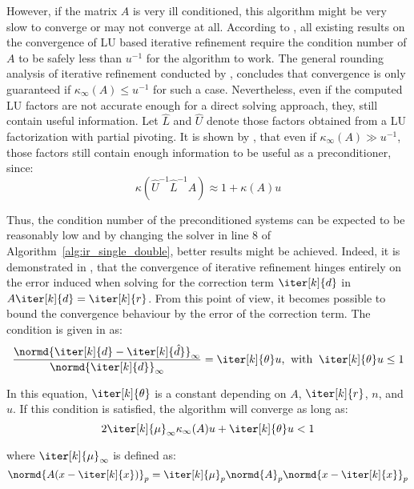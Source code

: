 However, if the matrix $A$ is very ill conditioned, this algorithm might be very slow to converge or may not converge at all. According to \cite{carson_accelerating_2018}, all existing results on the convergence of LU based iterative refinement require the condition number of $A$ to be safely less than $u^{-1}$ for the algorithm to work. The general rounding analysis of iterative refinement conducted by \cite{higham_accuracy_2002}, concludes that convergence is only guaranteed if $\kappa_\infty(A)\leq u^{-1}$ for such a case. Nevertheless, even if the computed LU factors are not accurate enough for a direct solving approach, they, still contain useful information. Let $\hat{L}$ and $\hat{U}$ denote those factors obtained from a LU factorization with partial pivoting. It is shown by \cite{carson_new_2017}, that even if $\kappa_\infty(A) \gg u^{-1}$, those factors still contain enough information to be useful as a preconditioner, since:
\begin{equation}
    \kappa(\hat{U}^{-1}\hat{L}^{-1}A)\approx 1 + \kappa(A)u
\end{equation}

\noindent Thus, the condition number of the preconditioned systems can be expected to be reasonably low and by changing the solver in line 8 of Algorithm~\hyperref[alg:ir_single_double]{\ref{alg:ir_single_double}}, better results might be achieved. Indeed, it is demonstrated in \cite{carson_new_2017}, that the convergence of iterative refinement hinges entirely on the error induced when solving for the correction term $\iter[k]{d}$ in $A\iter[k]{d} = \iter[k]{r}$. From this point of view, it becomes possible to bound the convergence behaviour by the error of the correction term. The condition is given in \cite{carson_new_2017} as:
\begin{equation}
\label{eqn:ir_error}
    \frac{\normd{\iter[k]{d}-\iter[k]{\hat{d}}}_\infty}{\normd{\iter[k]{d}}_\infty} =\iter[k]{\theta}u\text{,} \;\;\text{with} \;\; \iter[k]{\theta}u\leq 1
\end{equation}

\noindent In this equation, $\iter[k]{\theta}$ is a constant depending on $A$, $\iter[k]{r}$, $n$, and $u$. If this condition is satisfied, the algorithm will converge as long as:
\begin{equation}
  2\iter[k]{\mu}_\infty\kappa_\infty(A)u+\iter[k]{\theta}u<1
\end{equation}

\noindent where $\iter[k]{\mu}_\infty$ is defined as:
\begin{equation}
\normd{A(x-\iter[k]{x})}_p = \iter[k]{\mu}_p \normd{A}_p\normd{x-\iter[k]{x}}_p
\end{equation}

